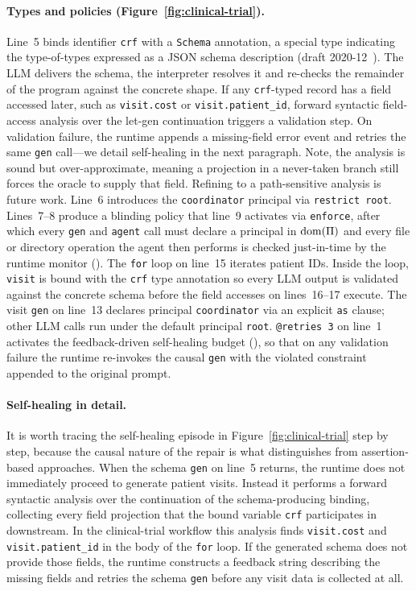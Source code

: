 \paragraph{Types and policies (Figure~\ref{fig:clinical-trial}).}
Line~5 binds identifier \texttt{crf} with a \texttt{Schema} annotation, a special
\pact type indicating the type-of-types expressed as a JSON schema description (draft 2020-12~\cite{jsonschema2020}).
The LLM delivers the schema, the interpreter resolves it and 
re-checks the remainder of the program against the concrete shape. 
If any \texttt{crf}-typed record has a field accessed later, such as \texttt{visit.cost} or 
\texttt{visit.patient\_id}, forward syntactic field-access 
analysis over the let-gen continuation triggers a validation step.
On validation failure, the runtime appends a 
missing-field error event and retries the same \texttt{gen} call---we detail
self-healing in the next paragraph. Note, the 
analysis is sound but over-approximate, meaning a projection in a 
never-taken branch still forces the oracle to supply that field. 
Refining to a path-sensitive analysis is future work. Line~6 introduces
the \texttt{coordinator} principal via
\texttt{restrict root}. Lines~7--8 produce a blinding policy that
line~9 activates via
\texttt{enforce}, after which every \texttt{gen} and \texttt{agent}
call must declare a principal in $\mathrm{dom}(\Pi)$ and every
file or directory operation the agent then performs is checked
just-in-time by the runtime monitor (). The
\texttt{for}
loop on line~15 iterates patient IDs. Inside the loop,
\texttt{visit} is bound with the \texttt{crf} type annotation so
every LLM output is validated against the concrete schema before
the field accesses on lines~16--17 execute. The visit \texttt{gen} on
line~13 declares principal \texttt{coordinator} via an explicit
\texttt{as} clause; other LLM calls run under the default
principal \texttt{root}. 
\texttt{@retries 3} on line~1 activates the feedback-driven 
self-healing budget (), so that on any 
validation failure the runtime re-invokes the causal \texttt{gen} 
with the violated constraint appended to the original prompt.


\paragraph{Self-healing in detail.}
It is worth tracing the self-healing episode in 
Figure~\ref{fig:clinical-trial} step by step, because the causal 
nature of the repair is what distinguishes \pact from 
assertion-based approaches. When the schema \texttt{gen} on 
line~5 returns, the runtime does not immediately proceed to 
generate patient visits. Instead it performs a forward syntactic 
analysis over the continuation of the schema-producing binding, 
collecting every field projection that the bound variable 
\texttt{crf} participates in downstream. In the clinical-trial 
workflow this analysis finds \texttt{visit.cost} and 
\texttt{visit.patient\_id} in the body of the \texttt{for} loop. 
If the generated schema does not provide those fields, the runtime 
constructs a feedback string describing the missing fields and 
retries the schema \texttt{gen} before any visit data is collected 
at all.

